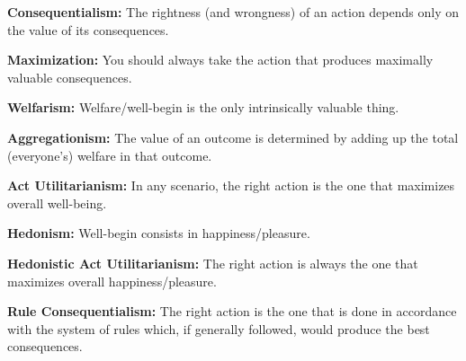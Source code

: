 \documentclass[12pt]{article}
\begin{document}
\textbf{Consequentialism:} The rightness (and wrongness) of an action depends only on the value of its consequences.

\textbf{Maximization:} You should always take the action that produces maximally valuable consequences.

\textbf{Welfarism:} Welfare/well-begin is the only intrinsically valuable thing.

\textbf{Aggregationism:} The value of an outcome is determined by adding up the total (everyone's) welfare in that outcome.

\textbf{Act Utilitarianism:} In any scenario, the right action is the one that maximizes overall well-being.

\textbf{Hedonism:} Well-begin consists in happiness/pleasure.

\textbf{Hedonistic Act Utilitarianism:} The right action is always the one that maximizes overall happiness/pleasure.

\textbf{Rule Consequentialism:} The right action is the one that is done in accordance with the system of rules which, if generally followed, would produce the best consequences.
\end{document}
